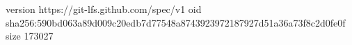 version https://git-lfs.github.com/spec/v1
oid sha256:590bd063a89d009c20edb7d77548a8743923972187927d51a36a73f8c2d0fe0f
size 173027
